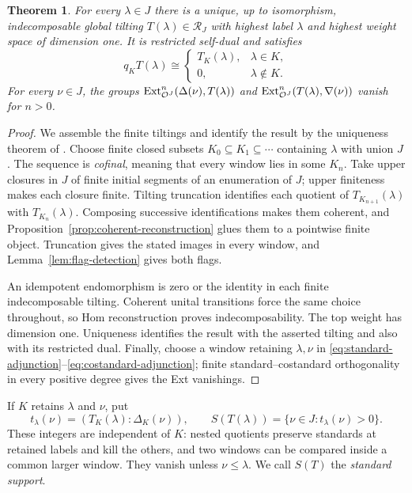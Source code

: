 \documentclass[11pt,reqno]{amsart}
\newcommand{\OO}{\mathcal O}\newcommand{\CC}{\mathscr C}\newcommand{\RR}{\mathcal R}\newcommand{\DD}{\mathcal D}
\newtheorem{theorem}{Theorem}[section]
\theoremstyle{definition}
\theoremstyle{remark}
\numberwithin{equation}{section}
\begin{document}
\begin{theorem}\label{thm:tilting}
For every $\lambda\in J$ there is a unique, up to isomorphism,
indecomposable global tilting $T(\lambda)\in\RR_J$
with highest label $\lambda$ and highest weight space of dimension one.
It is restricted self-dual and satisfies
\[
 q_KT(\lambda)\cong
 \begin{cases}T_K(\lambda),&\lambda\in K,\\0,&\lambda\notin K.
 \end{cases}
\]
For every $\nu\in J$, the groups
$\Ext^n_{\OO^J}(\Delta(\nu),T(\lambda))$ and
$\Ext^n_{\OO^J}(T(\lambda),\nabla(\nu))$ vanish for
$n>0$.
\end{theorem}
\begin{proof}
We assemble the finite tiltings and identify the result by the
uniqueness theorem of \cite[Theorem~4.18]{BS}. Choose finite closed subsets
$K_0\subseteq K_1\subseteq\cdots$ containing $\lambda$ with union $J$.
The sequence is \emph{cofinal}, meaning that every window lies in
some $K_n$. Take upper closures in $J$ of finite initial segments
of an enumeration of $J$; upper finiteness makes each closure finite.
Tilting truncation \cite[Corollary~4.5]{BS}
identifies each quotient of $T_{K_{n+1}}(\lambda)$ with
$T_{K_n}(\lambda)$. Composing successive identifications makes them
coherent, and Proposition~\ref{prop:coherent-reconstruction} glues them
to a pointwise finite object. Truncation gives the stated images in
every window, and Lemma~\ref{lem:flag-detection} gives both flags.

An idempotent endomorphism is zero or the identity in each finite
indecomposable tilting. Coherent unital transitions force the same
choice throughout, so Hom reconstruction proves indecomposability.
The top weight has dimension one. Uniqueness identifies the result
with the asserted tilting and also with its restricted dual.
Finally, choose a window retaining $\lambda,\nu$ in
\eqref{eq:standard-adjunction}--\eqref{eq:costandard-adjunction};
finite standard--costandard orthogonality in every positive degree
gives the Ext vanishings.
\end{proof}

If $K$ retains $\lambda$ and $\nu$, put
\begin{equation}\label{eq:stable-multiplicity}
 t_\lambda(\nu)=(T_K(\lambda):\Delta_K(\nu)),
 \qquad S(T(\lambda))=\{\nu\in J:t_\lambda(\nu)>0\}.
\end{equation}
These integers are independent of $K$: nested quotients preserve
standards at retained labels and kill the others, and two windows
can be compared inside a common larger window. They vanish unless
$\nu\leq\lambda$. We call $S(T)$ the \emph{standard support}.
\end{document}
